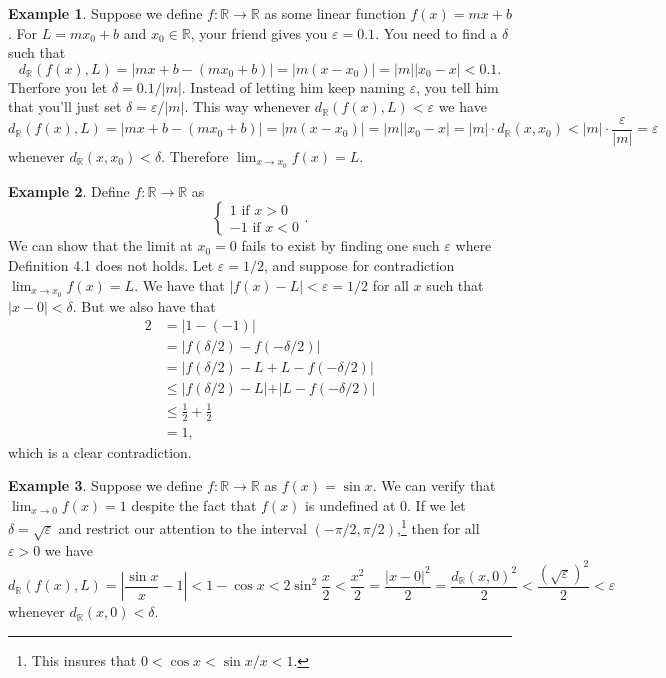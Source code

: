 \documentclass{article}
\newcommand{\R}{\mathbb{R}}
\theoremstyle{definition}
\newtheorem{example}{Example}[section]
\begin{document}
\begin{example}
	Suppose we define $ f:\R\to\R $ as some linear function $ f(x)=mx+b $. For $ L=mx_0+b $ and $ x_0\in\R $, your friend gives you $ \varepsilon=0.1 $. You need to find a $ \delta $ such that $$d_\R(f(x),L)=|mx+b-(mx_0+b)|=|m(x-x_0)|=|m||x_0-x|<0.1.$$ Therfore you let $ \delta=0.1/|m| $. Instead of letting him keep naming $ \varepsilon $, you tell him that you'll just set $ \delta=\varepsilon/|m| $. This way whenever $ d_\R(f(x),L)<\varepsilon $ we have 
	$$ d_\R(f(x),L)=|mx+b-(mx_0+b)|=|m(x-x_0)|=|m||x_0-x|=|m|\cdot d_\R(x,x_0)<|m|\cdot\frac{\varepsilon}{|m|}=\varepsilon $$ whenever $ d_\R(x,x_0)<\delta $. Therefore $ \lim_{x\to x_0}f(x)=L $.  
\end{example}
\begin{example}
	Define $ f:\R\to\R $ as 
	$$ \begin{cases}
	1\text{ if }x>0\\-1\text{ if }x<0
	\end{cases} .$$
	We can show that the limit at $ x_0=0 $ fails to exist by finding one such $ \varepsilon $ where Definition 4.1 does not holds. Let $ \varepsilon=1/2 $, and suppose for contradiction $ \lim_{x\to x_0}f(x)=L $. We have that $ |f(x)-L|<\varepsilon=1/2 $ for all $ x $ such that $ |x-0|<\delta $. But we also have that 
	\begin{align*}
		2&=|1-(-1)|\\
		&=\left\lvert f(\delta/2)-f(-\delta/2) \right\rvert\\
		&=\left\lvert f(\delta/2)-L+L-f(-\delta/2) \right\rvert\\
		&\le\left\lvert f(\delta/2)-L|+|L-f(-\delta/2) \right\rvert\\
		&\le\frac{1}{2}+\frac{1}{2}\\&=1,
	\end{align*}
	which is a clear contradiction.
\end{example}
\begin{example}
	Suppose we define $ f:\R\to\R $ as $ f(x)=\sin x $. We can verify that $ \lim_{x\to 0}f(x)=1 $ despite the fact that $ f(x) $ is undefined at $ 0 $. If we let $ \delta=\sqrt{\varepsilon} $ and restrict our attention to the interval $ (-\pi/2,\pi/2) $,\footnote{This insures that $ 0<\cos x<\sin x/x <1 $.} then for all $ \varepsilon>0 $ we have $$d_\R(f(x),L)=\left\lvert \frac{\sin x}{x}-1\right\rvert<1-\cos x<2\sin^2\frac{x}{2}<\frac{x^2}{2}=\frac{|x-0|^2}{2}=\frac{d_\R(x,0)^2}{2}<\frac{(\sqrt{\varepsilon})^2}{2}<\varepsilon$$ whenever $ d_\R(x,0)<\delta $. 
\end{example}
\end{document}
